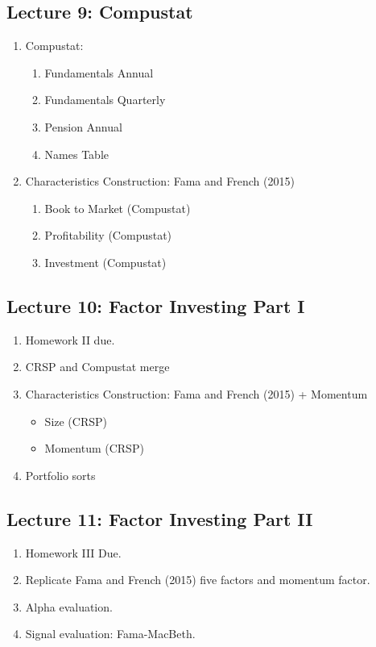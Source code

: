 \documentclass[12pts]{article}
\begin{document}
\subsection*{Lecture 9: Compustat}
\begin{enumerate}
\item Compustat:
	\begin{enumerate}
		\item Fundamentals Annual
		\item Fundamentals Quarterly
		\item Pension Annual
		\item Names Table 
	\end{enumerate}

\item Characteristics Construction: Fama and French (2015) 
\begin{enumerate}
	\item Book to Market (Compustat)
	\item Profitability (Compustat)
	\item Investment (Compustat)
\end{enumerate}
\end{enumerate}

\subsection*{Lecture 10: Factor Investing Part I}

\begin{enumerate}
	\item Homework II due.
	\item CRSP and Compustat merge
	\item Characteristics Construction: Fama and French (2015) + Momentum
	\begin{itemize}
		\item Size (CRSP)
		\item Momentum (CRSP)
	\end{itemize}
	\item Portfolio sorts
\end{enumerate}

\subsection*{Lecture 11: Factor Investing Part II}
\begin{enumerate}
	\item Homework III Due.
	\item Replicate Fama and French (2015) five factors and momentum factor.
	\item Alpha evaluation.
	\item Signal evaluation: Fama-MacBeth.
\end{enumerate}	
\end{document}
